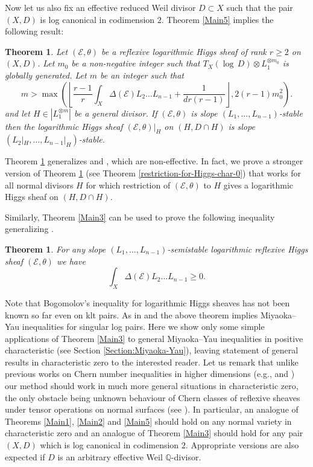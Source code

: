\documentclass[12pt]{article}
\theoremstyle{plain}
\newtheorem{Theorem}[Thm]{\sc Theorem}
\theoremstyle{definition}
\theoremstyle{remark}
\newcommand{\QQ}{{\mathbb Q}}
\newcommand{\cE}{{\mathcal E}}
\begin{document}
Now let  us also fix an effective reduced Weil divisor $D\subset X$ such that the pair $(X,D)$ is log canonical in codimension $2$. Theorem \ref{Main5}  implies the following result:


\begin{Theorem}	\label{Main6}
Let  $(\cE , \theta )$ be a reflexive logarithmic Higgs sheaf of rank $r\ge 2$ on $(X,D)$.
Let $m_0$ be a non-negative integer such that $T_X (\log \, D)\otimes L_1^{\otimes m_0}$ is globally generated. Let   $m$ be an integer such that
$$m>\max \left(\left\lfloor \frac{r-1}{ r}\int_X\Delta (\cE)L_2\dots L_{n-1} +\frac{1}{dr(r-1)}
\right\rfloor , 2(r-1)m_0^2 \right).$$
and let $H\in |L_1^{\otimes m}|$ be a general divisor. If  $(\cE , \theta )$ is slope $(L_1,...,L_{n-1})$-stable then the logarithmic Higgs sheaf $(\cE , \theta )|_H$ on $(H,D\cap H)$ is  slope $(L_2|_H,\dots ,L_{n-1}|_H)$-stable.
\end{Theorem}

Theorem \ref{Main6} generalizes \cite[Theorem 5.22]{GKPT2} and \cite[Theorem 6.1]{GKPT1}, which are non-effective. In fact, we prove a stronger version of Theorem \ref{Main6} (see Theorem \ref{restriction-for-Higgs-char-0}) that works for all normal divisors $H$ for which  restriction of $(\cE , \theta )$ to $H$ gives a  logarithmic Higgs sheaf  on $(H,D\cap H)$.

Similarly, Theorem  \ref{Main3} can be used to prove the following inequality generalizing \cite[Theorem 6.1]{GKPT2}.

\begin{Theorem} \label{Main4} 
For any slope $(L_1,...,L_{n-1})$-semistable logarithmic reflexive Higgs sheaf $(\cE, \theta)$ we have
	$$\int_X \Delta (\cE) L_2...L_{n-1}\ge 0.$$
\end{Theorem}

Note that Bogomolov's inequality for logarithmic Higgs sheaves has not been known so far even 
on klt pairs. As in \cite{Si} and \cite{GKPT2} the above theorem implies Miyaoka--Yau inequalities for singular log pairs. Here we show only some simple applications of Theorem \ref{Main3} to general Miyaoka--Yau inequalities in positive characteristic (see Section \ref{Section:Miyaoka-Yau}), leaving statement of general results in characteristic zero to the interested reader. Let us remark that unlike previous works on Chern number inequalities in higher dimensions (e.g., \cite{GKPT2} and \cite{GT})
our method should work in much more general situations in characteristic zero, the only obstacle being  unknown behaviour of Chern classes of reflexive sheaves under tensor operations on normal surfaces (see \cite{La-Chern}). In particular, an analogue of Theorems \ref{Main1}, \ref{Main2} and \ref{Main5}
should hold on any normal variety in characteristic zero and an analogue of Theorem \ref{Main3} should hold for any pair $(X,D)$ which is log canonical in codimension $2$. Appropriate versions are also expected if $D$ is an arbitrary effective Weil $\QQ$-divisor.
\end{document}
